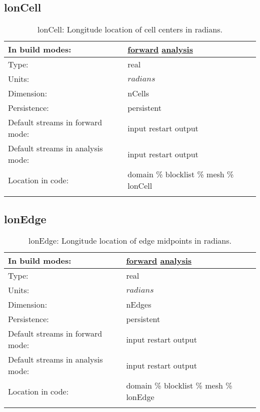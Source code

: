 \subsection[lonCell]{lonCell}
\label{subsec:var_sec_mesh_lonCell}
\begin{center}
\begin{longtable}{| p{2.0in} | p{4.0in} |}
        \hline 
        In build modes: & \hyperref[subsec:forward_var_tab_mesh]{forward} \hyperref[subsec:analysis_var_tab_mesh]{analysis} \\
        \hline 
        Type: & real \\
        \hline 
        Units: & $radians$ \\
        \hline 
        Dimension: & nCells \\
        \hline 
        Persistence: & persistent \\
        \hline 
		 Default streams in forward mode: &  input restart output \\
        \hline 
		 Default streams in analysis mode: &  input restart output \\
        \hline 
		 Location in code: & domain \% blocklist \% mesh \% lonCell \\
		 \hline 
    \caption{lonCell: Longitude location of cell centers in radians.}
\end{longtable}
\end{center}
\subsection[lonEdge]{lonEdge}
\label{subsec:var_sec_mesh_lonEdge}
\begin{center}
\begin{longtable}{| p{2.0in} | p{4.0in} |}
        \hline 
        In build modes: & \hyperref[subsec:forward_var_tab_mesh]{forward} \hyperref[subsec:analysis_var_tab_mesh]{analysis} \\
        \hline 
        Type: & real \\
        \hline 
        Units: & $radians$ \\
        \hline 
        Dimension: & nEdges \\
        \hline 
        Persistence: & persistent \\
        \hline 
		 Default streams in forward mode: &  input restart output \\
        \hline 
		 Default streams in analysis mode: &  input restart output \\
        \hline 
		 Location in code: & domain \% blocklist \% mesh \% lonEdge \\
		 \hline 
    \caption{lonEdge: Longitude location of edge midpoints in radians.}
\end{longtable}
\end{center}
